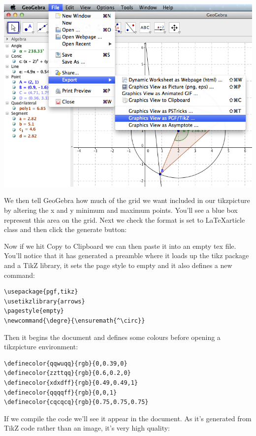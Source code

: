 \documentclass[cn,11pt, simple]{elegantbook}
\begin{document}
\centerline{\includegraphics[scale=0.55]{Tikzfig6}}

We then tell GeoGebra how much of the grid we want included in our tikzpicture by altering the x and y minimum and maximum points. You'll see a blue box represent this area on the grid. Next we check the format is set to \LaTeX article class and then click the generate button:


Now if we hit Copy to Clipboard we can then paste it into an empty tex file. You'll notice that it has generated a preamble where it loads up the tikz package and a TikZ library, it sets the page style to empty and it also defines a new command:

\begin{lstlisting}
\usepackage{pgf,tikz}
\usetikzlibrary{arrows}
\pagestyle{empty}
\newcommand{\degre}{\ensuremath{^\circ}}
\end{lstlisting}

Then it begins the document and defines some colours before opening a tikzpicture environment:

\begin{lstlisting}
\definecolor{qqwuqq}{rgb}{0,0.39,0}
\definecolor{zzttqq}{rgb}{0.6,0.2,0}
\definecolor{xdxdff}{rgb}{0.49,0.49,1}
\definecolor{qqqqff}{rgb}{0,0,1}
\definecolor{cqcqcq}{rgb}{0.75,0.75,0.75}
\end{lstlisting}

If we compile the code we'll see it appear in the document. As it's generated
from TikZ code rather than an image, it's very high quality:
\end{document}
